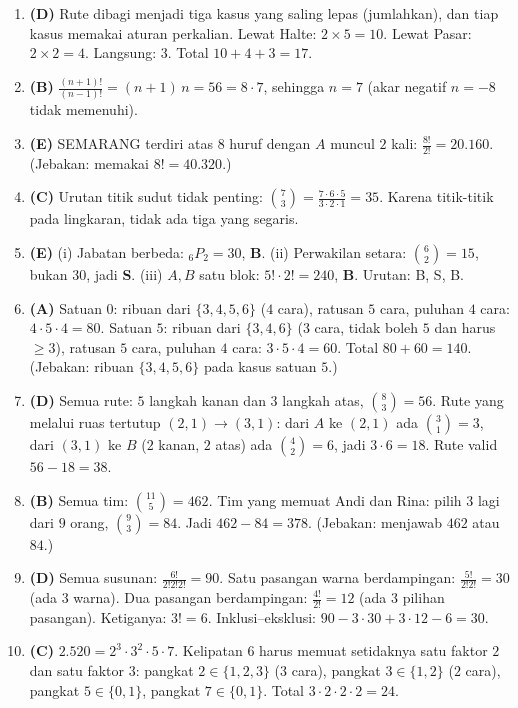 \documentclass[a4paper,11pt]{article}
\newcommand{\Pm}[2]{{}_{#1}P_{#2}}
\newcounter{no}
\begin{document}
\small\begin{enumerate}[leftmargin=2em,itemsep=2pt,topsep=2pt]
\item[\textbf{1.}] \textbf{(D)} Rute dibagi menjadi tiga kasus yang saling lepas (jumlahkan), dan tiap kasus memakai aturan perkalian. Lewat Halte: $2\times5=10$. Lewat Pasar: $2\times2=4$. Langsung: $3$. Total $10+4+3=17$.
\item[\textbf{2.}] \textbf{(B)} $\frac{(n+1)!}{(n-1)!}=(n+1)\,n=56=8\cdot7$, sehingga $n=7$ (akar negatif $n=-8$ tidak memenuhi).
\item[\textbf{3.}] \textbf{(E)} SEMARANG terdiri atas $8$ huruf dengan $A$ muncul $2$ kali: $\frac{8!}{2!}=20.160$. (Jebakan: memakai $8!=40.320$.)
\item[\textbf{4.}] \textbf{(C)} Urutan titik sudut tidak penting: $\binom73=\frac{7\cdot6\cdot5}{3\cdot2\cdot1}=35$. Karena titik-titik pada lingkaran, tidak ada tiga yang segaris.
\item[\textbf{5.}] \textbf{(E)} (i) Jabatan berbeda: $\Pm62=30$, \textbf{B}. (ii) Perwakilan setara: $\binom62=15$, bukan $30$, jadi \textbf{S}. (iii) $A,B$ satu blok: $5!\cdot2!=240$, \textbf{B}. Urutan: B, S, B.
\item[\textbf{6.}] \textbf{(A)} Satuan $0$: ribuan dari $\{3,4,5,6\}$ ($4$ cara), ratusan $5$ cara, puluhan $4$ cara: $4\cdot5\cdot4=80$. Satuan $5$: ribuan dari $\{3,4,6\}$ ($3$ cara, tidak boleh $5$ dan harus $\ge3$), ratusan $5$ cara, puluhan $4$ cara: $3\cdot5\cdot4=60$. Total $80+60=140$. (Jebakan: ribuan $\{3,4,5,6\}$ pada kasus satuan $5$.)
\item[\textbf{7.}] \textbf{(D)} Semua rute: $5$ langkah kanan dan $3$ langkah atas, $\binom83=56$. Rute yang melalui ruas tertutup $(2,1)\to(3,1)$: dari $A$ ke $(2,1)$ ada $\binom31=3$, dari $(3,1)$ ke $B$ ($2$ kanan, $2$ atas) ada $\binom42=6$, jadi $3\cdot6=18$. Rute valid $56-18=38$.
\item[\textbf{8.}] \textbf{(B)} Semua tim: $\binom{11}5=462$. Tim yang memuat Andi dan Rina: pilih $3$ lagi dari $9$ orang, $\binom93=84$. Jadi $462-84=378$. (Jebakan: menjawab $462$ atau $84$.)
\item[\textbf{9.}] \textbf{(D)} Semua susunan: $\frac{6!}{2!2!2!}=90$. Satu pasangan warna berdampingan: $\frac{5!}{2!2!}=30$ (ada $3$ warna). Dua pasangan berdampingan: $\frac{4!}{2!}=12$ (ada $3$ pilihan pasangan). Ketiganya: $3!=6$. Inklusi--eksklusi: $90-3\cdot30+3\cdot12-6=30$.
\item[\textbf{10.}] \textbf{(C)} $2.520=2^3\cdot3^2\cdot5\cdot7$. Kelipatan $6$ harus memuat setidaknya satu faktor $2$ dan satu faktor $3$: pangkat $2\in\{1,2,3\}$ ($3$ cara), pangkat $3\in\{1,2\}$ ($2$ cara), pangkat $5\in\{0,1\}$, pangkat $7\in\{0,1\}$. Total $3\cdot2\cdot2\cdot2=24$.

\end{enumerate}
\end{document}
